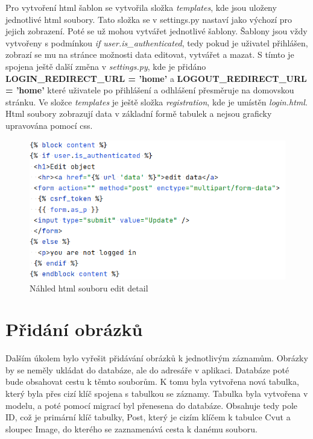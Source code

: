 Pro vytvoření html šablon se vytvořila složka \emph{templates}, kde jsou uloženy jednotlivé html soubory. Tato složka se v settings.py nastaví jako výchozí pro jejich zobrazení. Poté se už mohou vytvářet jednotlivé šablony. Šablony jsou vždy vytvořeny s podmínkou \emph{if user.is\_authenticated}, tedy pokud je uživatel přihlášen, zobrazí se mu na stránce možnosti data editovat, vytvářet a mazat. S tímto je spojena ještě další změna v \emph{settings.py}, kde je přidáno \textbf{LOGIN\_REDIRECT\_URL = 'home'} a \textbf{LOGOUT\_REDIRECT\_URL = 'home'} které uživatele po přihlášení a odhlášení přesměruje na domovskou stránku. Ve složce \emph{templates} je ještě složka \emph{registration}, kde je umístěn \emph{login.html}. Html soubory zobrazují data v základní formě tabulek a nejsou graficky upravována pomocí css. 

\begin{figure}[H] \centering
    \includegraphics[width=350pt]{./pictures/8-edit-detail-html.PNG}
    \caption[Náhled html souboru edit detail]{Náhled html souboru edit detail}
	\label{fig:Náhled html souboru edit detail}
\end{figure}


\newpage

\section{Přidání obrázků}

Dalším úkolem bylo vyřešit přidávání obrázků k jednotlivým záznamům. Obrázky by se neměly ukládat do databáze, ale do adresáře v aplikaci. Databáze poté bude obsahovat cestu k těmto souborům. K tomu byla vytvořena nová tabulka, který byla přes cizí klíč spojena s tabulkou se záznamy. Tabulka byla vytvořena v modelu, a poté pomocí migrací byl přenesena do databáze. Obsahuje tedy pole ID, což je primární klíč tabulky, Post, který je cizím klíčem k tabulce Cvut a sloupec Image, do kterého se zaznamenává cesta k danému souboru.

